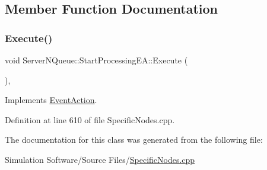 \subsection{Member Function Documentation}
\mbox{\label{class_server_n_queue_1_1_start_processing_e_a_a734000fd4380b39594df88706f674dd0}} 
\subsubsection{\texorpdfstring{Execute()}{Execute()}}
{\footnotesize\ttfamily void Server\+N\+Queue\+::\+Start\+Processing\+E\+A\+::\+Execute (\begin{DoxyParamCaption}{ }\end{DoxyParamCaption})\hspace{0.3cm}{\ttfamily [inline]}, {\ttfamily [virtual]}}



Implements \hyperlink{class_event_action_a62b9d07abb4ca8e7c078b076a1ab1a9f}{Event\+Action}.



Definition at line 610 of file Specific\+Nodes.\+cpp.



The documentation for this class was generated from the following file\+:\begin{DoxyCompactItemize}
\item 
Simulation Software/\+Source Files/\hyperlink{_specific_nodes_8cpp}{Specific\+Nodes.\+cpp}\end{DoxyCompactItemize}
